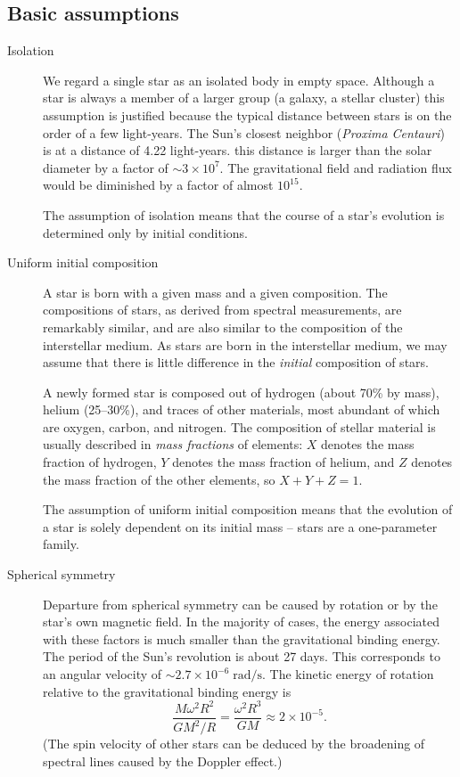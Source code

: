 \documentclass[10pt,amsmath,amssymb,aps,pra]{revtex4-2}
\newcommand{\unit}[1]{\;\mathrm{#1}}
\begin{document}
\subsection{Basic assumptions}
\begin{description}

\item[Isolation] We regard a single star as an isolated body in empty space.
Although a star is always a member of a larger group (a galaxy, a stellar
cluster) this assumption is justified because the typical distance between stars
is on the order of a few light-years. The Sun's closest neighbor (\emph{Proxima
Centauri}) is at a distance of 4.22 light-years. this distance is larger than
the solar diameter by a factor of $\sim{3}\times{10^7}$. The gravitational field
and radiation flux would be diminished by a factor of almost $10^{15}$.

The assumption of isolation means that the course of a star's evolution is
determined only by initial conditions.

\item[Uniform initial composition] A star is born with a given mass and a given
composition. The compositions of stars, as derived from spectral measurements,
are remarkably similar, and are also similar to the composition of the
interstellar medium. As stars are born in the interstellar medium, we may assume
that there is little difference in the \emph{initial} composition of stars.

A newly formed star is composed out of hydrogen (about 70\% by mass), helium
(25--30\%), and traces of other materials, most abundant of which are oxygen,
carbon, and nitrogen. The composition of stellar material is usually described
in \emph{mass fractions} of elements: $X$ denotes the mass fraction of hydrogen,
$Y$ denotes the mass fraction of helium, and $Z$ denotes the mass fraction of
the other elements, so $X+Y+Z=1$.

The assumption of uniform initial composition means that the evolution of a star
is solely dependent on its initial mass -- stars are a one-parameter family.

\item[Spherical symmetry] Departure from spherical symmetry can be caused by
rotation or by the star's own magnetic field. In the majority of cases, the
energy associated with these factors is much smaller than the gravitational
binding energy. The period of the Sun's revolution is about 27 days. This
corresponds to an angular velocity of $\sim{2.7}\times10^{-6}\unit{rad/s}$. The
kinetic energy of rotation relative to the gravitational binding energy is
\begin{equation*}
\frac{M\omega^2R^2}{GM^2/R}=\frac{\omega^2R^3}{GM}\approx2\times10^{-5}.
\end{equation*}
(The spin velocity of other stars can be deduced by the broadening of spectral
lines caused by the Doppler effect.)


\end{description}
\end{document}

